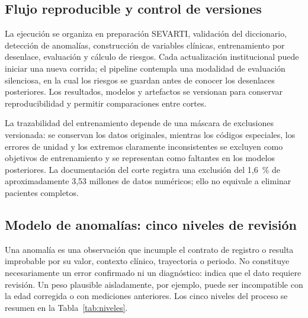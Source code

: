 \documentclass[letterpaper,10pt]{article}
\begin{document}
\subsection{Flujo reproducible y control de versiones}

La ejecución se organiza en preparación SEVARTI, validación del diccionario, detección de anomalías, construcción de variables clínicas, entrenamiento por desenlace, evaluación y cálculo de riesgos. Cada actualización institucional puede iniciar una nueva corrida; el pipeline contempla una modalidad de evaluación silenciosa, en la cual los riesgos se guardan antes de conocer los desenlaces posteriores. Los resultados, modelos y artefactos se versionan para conservar reproducibilidad y permitir comparaciones entre cortes.

La trazabilidad del entrenamiento depende de una máscara de exclusiones versionada: se conservan los datos originales, mientras los códigos especiales, los errores de unidad y los extremos claramente inconsistentes se excluyen como objetivos de entrenamiento y se representan como faltantes en los modelos posteriores. La documentación del corte registra una exclusión del 1,6~\% de aproximadamente 3,53 millones de datos numéricos; ello no equivale a eliminar pacientes completos.

\subsection{Modelo de anomalías: cinco niveles de revisión}

Una anomalía es una observación que incumple el contrato de registro o resulta improbable por su valor, contexto clínico, trayectoria o periodo. No constituye necesariamente un error confirmado ni un diagnóstico: indica que el dato requiere revisión. Un peso plausible aisladamente, por ejemplo, puede ser incompatible con la edad corregida o con mediciones anteriores. Los cinco niveles del proceso se resumen en la Tabla~\ref{tab:niveles}.
\end{document}
